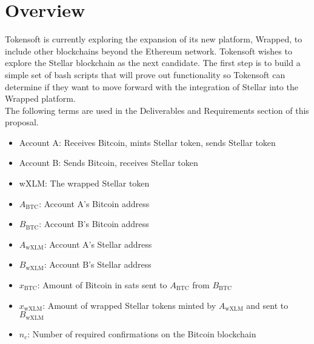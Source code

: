 \section{Overview}
Tokensoft is currently exploring the expansion of its new platform, Wrapped, to include other blockchains beyond the Ethereum network.
Tokensoft wishes to explore the Stellar blockchain as the next candidate.
The first step is to build a simple set of bash scripts that will prove out functionality so Tokensoft can determine if they want to move forward with the integration of Stellar into the Wrapped platform. \\

\noindent
The following terms are used in the Deliverables and Requirements section of this proposal.

\begin{itemize}[noitemsep]
\item Account A:          Receives Bitcoin, mints Stellar token, sends Stellar token
\item Account B:          Sends Bitcoin, receives Stellar token
\item wXLM:               The wrapped Stellar token
\item $A_\mathrm{BTC}$:   Account A's Bitcoin address
\item $B_\mathrm{BTC}$:   Account B's Bitcoin address
\item $A_\mathrm{wXLM}$:  Account A's Stellar address
\item $B_\mathrm{wXLM}$:  Account B's Stellar address
\item $x_\mathrm{BTC}$:   Amount of Bitcoin in sats sent to $A_\mathrm{BTC}$ from $B_\mathrm{BTC}$
\item $x_\mathrm{wXLM}$:  Amount of wrapped Stellar tokens minted by $A_\mathrm{wXLM}$ and sent to $B_\mathrm{wXLM}$
\item $n_c$:              Number of required confirmations on the Bitcoin blockchain
\end{itemize}

